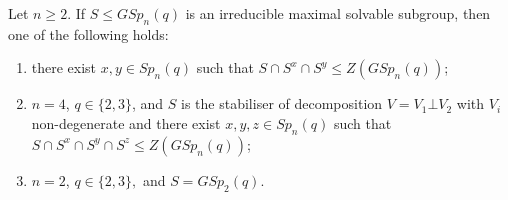 \begin{Th}\label{sympirr}
Let $n \ge 2$. If $S \le GSp_n(q)$ is an irreducible maximal solvable  subgroup, then one of the following holds:
\begin{enumerate}[font=\normalfont]
\item  there exist $x,y \in Sp_n(q)$ such that $S \cap S^x \cap S^y \le Z(GSp_n(q))$; \label{sympirr1}
\item \label{sympirr2} $n=4$, $q \in \{2,3\}$, and $S$ is the stabiliser of decomposition $V =V_1 \bot V_2$ with $V_i$ non-degenerate and there 
exist $x,y,z \in Sp_n(q)$ such that $S \cap S^x \cap S^y \cap S^z \le Z(GSp_n(q))$; 
\item $n=2$, $q \in \{2,3\},$ and $S=GSp_2(q).$ \label{sympirr3}
\end{enumerate}
\end{Th}
